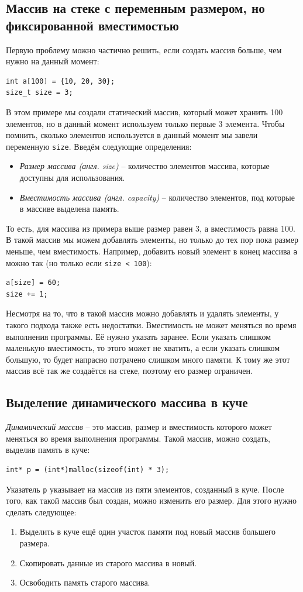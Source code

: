 \documentclass{article}
\begin{document}
\subsection*{Массив на стеке с переменным размером, но фиксированной вместимостью}
Первую проблему можно частично решить, если создать массив больше, чем нужно на данный момент:
\begin{lstlisting}
int a[100] = {10, 20, 30};
size_t size = 3;
\end{lstlisting}
В этом примере мы создали статический массив, который может хранить 100 элементов, но в данный момент используем только первые 3 элемента. Чтобы помнить, сколько элементов используется в данный момент мы завели переменную \texttt{size}. Введём следующие определения:
\begin{itemize}
\item \textit{Размер массива (англ. size)} -- количество элементов массива, которые доступны для использования.
\item \textit{Вместимость массива (англ. capacity)} -- количество элементов, под которые в массиве выделена память.
\end{itemize}
То есть, для массива из примера выше размер равен 3, а вместимость равна 100.
В такой массив мы можем добавлять элементы, но только до тех пор пока размер меньше, чем вместимость. Например, добавить новый элемент в конец массива \texttt{a} можно так (но только если \texttt{size < 100}):
\begin{lstlisting}
a[size] = 60;
size += 1;
\end{lstlisting}
Несмотря на то, что в такой массив можно добавлять и удалять элементы, у такого подхода также есть недостатки. Вместимость не может меняться во время выполнения программы. Её нужно указать заранее. Если указать слишком маленькую вместимость, то этого может не хватить, а если указать слишком большую, то будет напрасно потрачено слишком много памяти. К тому же этот массив всё так же создаётся на стеке, поэтому его размер ограничен.

\subsection*{Выделение динамического массива в куче}
\textit{Динамический массив} -- это массив, размер и вместимость которого может меняться во время выполнения программы. Такой массив, можно создать, выделив память в куче:
\begin{lstlisting}
int* p = (int*)malloc(sizeof(int) * 3);
\end{lstlisting}
Указатель \texttt{p} указывает на массив из пяти элементов, созданный в куче.
После того, как такой массив был создан, можно изменить его размер. Для этого нужно сделать следующее:
\begin{enumerate}
\item Выделить в куче ещё один участок памяти под новый массив большего размера.
\item Скопировать данные из старого массива в новый.
\item Освободить память старого массива.
\end{enumerate}
\end{document}

